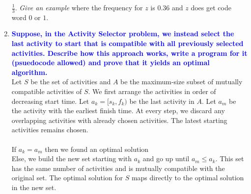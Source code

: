 \documentclass[11pt]{article}
\begin{document}
\begin{enumerate}
{{$\frac{1}{3}$.  {\em Give an example} where the frequency for $z$ is $0.36$ and
$z$ does get code word $0$ or $1$.}}
\item  \textbf{\textcolor{blue}{Suppose, in the Activity Selector problem, we
instead select the last activity to start that is compatible with all previously
selected activities. Describe how this
approach works, write a program for it (psuedocode allowed) and prove that it
yields an optimal algorithm.}}
    \\ Let $S$ be the set of activities and $A$ be the maximum-size subset of mutually compatible activities of $S$. We first arrange the activities in order of decreasing start time. Let $a_k = [s_k, f_k)$ be the last activity in $A$. Let $a_m$ be the activity with the earliest finish time. At every step, we discard any overlapping activities with already chosen activities. The latest starting activities remains chosen.
    \\\\ If $a_k = a_m$ then we found an optimal solution
    \\ Else, we build the new set starting with $a_k$ and go up until $a_m \leq a_k$. This set has the same number of activities and is mutually compatible with the original set. The optimal solution for $S$ maps directly to the optimal solution in the new set.    


\end{enumerate}
\end{document}
